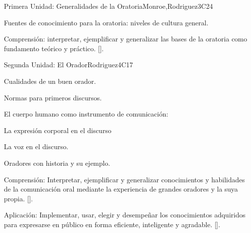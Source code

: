 \begin{syllabus}
\begin{unit}{}{Primera Unidad: Generalidades de la Oratoria}{Monroe,Rodriguez}{3}{C24}
\begin{topics}
	\item Fuentes de conocimiento para la oratoria: niveles de cultura general.
\end{topics}
\begin{learningoutcomes}
	\item Comprensión:  interpretar, ejemplificar y generalizar las bases de la oratoria como fundamento teórico  y  práctico. [\Usage].
\end{learningoutcomes}
\end{unit}

\begin{unit}{}{Segunda Unidad: El Orador}{Rodriguez}{4}{C17}
\begin{topics}
	\item Cualidades de un buen orador.
	\item Normas para primeros discursos.
	\item El cuerpo humano como instrumento de comunicación:
		\begin{subtopics}
			\item La expresión  corporal en el discurso
			\item La voz en el discurso.
	   	\end{subtopics}
	\item Oradores con historia y su ejemplo.
\end{topics}
\begin{learningoutcomes}
	\item Comprensión: Interpretar, ejemplificar y generalizar
conocimientos y habilidades de la comunicación oral mediante la experiencia de grandes oradores y la suya propia. [\Usage].
	\item Aplicación: Implementar, usar, elegir y desempeñar los conocimientos adquiridos para  expresarse en público en forma eficiente, inteligente y agradable. [\Usage].
\end{learningoutcomes}
\end{unit}


\end{syllabus}
